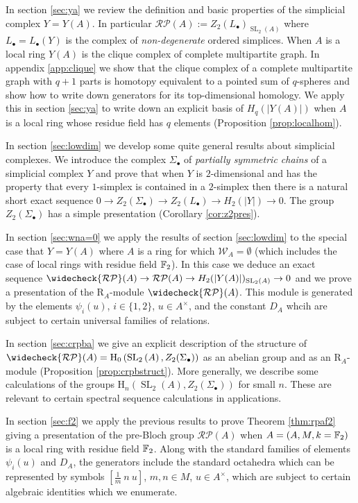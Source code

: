 \documentclass[12pt]{amsart}
\theoremstyle{definition}
\newcommand{\F}[1]{\Bbb{F}_{#1}}
\newcommand{\wn}[1]{\mathcal{W}_{#1}}%
\newcommand{\scyc}[1]{\left[ #1 \right]} %
\newcommand{\spl}[2]{\operatorname{SL}_{#1}\left(#2\right)}
\newcommand{\rpb}[1]{\mathcal{RP}(#1)}%
\newcommand{\crpb}[1]{\widecheck{\mathcal{RP}}(#1)}
\newcommand{\suss}[2]{\psi_{#1}\left( #2\right)}
\newcommand{\cconst}[1]{D_{#1}}
\newcommand{\<}{\langle}
\renewcommand{\>}{\rangle}
\newcommand{\sgr}[1]{\mathrm{R}_{#1}}%
\newcommand{\ho}[3]{\mathrm{H}_{#1}\left( #2,#3 \right)}
\begin{document}
In section \ref{sec:ya} we review the definition and basic properties of the simplicial complex $Y=Y(A)$. In particular $\rpb{A}:=Z_2(L_\bullet)_{\spl{2}{A}}$ where  $L_\bullet=L_\bullet(Y)$ is the complex of \emph{non-degenerate} ordered simplices. When $A$ is a local ring $Y(A)$ is the clique complex of complete multipartite graph.
In appendix \ref{app:clique} we show that the clique complex of a complete multipartite graph with $q+1$ parts  is homotopy equivalent to  a pointed sum of $q$-spheres and show how to write down generators for its top-dimensional homology. We apply this in section \ref{sec:ya} to write down an explicit basis  of $H_q(|Y(A)|)$ when $A$ is a local ring whose residue field has $q$ elements  (Proposition \ref{prop:localhom}).

In section \ref{sec:lowdim} we develop some quite general results about simplicial complexes. We introduce the complex $\Sigma_\bullet$ of \emph{partially symmetric chains} of a simplicial complex $Y$ and prove that when $Y$ is $2$-dimensional and has the property that every $1$-simplex is contained in a $2$-simplex then there is a natural short exact sequence 
$0\to Z_2(\Sigma_\bullet)\to Z_2(L_\bullet)\to H_2(|Y|)\to 0$. The group $Z_2(\Sigma_\bullet)$ has a simple presentation  (Corollary \ref{cor:z2pres}).

In section \ref{sec:wna=0} we apply the results of section \ref{sec:lowdim} to the special case that $Y=Y(A)$ where $A$ is a ring for which $\wn{A}=\emptyset$ (which includes the case of local rings with residue field $\F{2}$).  In this case we deduce an exact sequence $\crpb{A}\to\rpb{A}\to H_2(|Y(A)|)_{\spl{2}{A}}\to 0$ and we prove a presentation of the $\sgr{A}$-module
$\crpb{A}$. This module is generated by the elements $\suss{i}{u}$, $i\in \{ 1,2\}$, $u\in A^\times$,  and the constant $\cconst{A}$ whcih are subject to certain universal families of relations. 

In section \ref{sec:crpba} we give an explicit description of the structure of $\crpb{A}=\ho{0}{\spl{2}{A}}{Z_2(\Sigma_\bullet)}$ as an abelian group and as an $\sgr{A}$-module
 (Proposition \ref{prop:crpbstruct}).  More generally, we describe some  
calculations of the groups
 $\ho{n}{\spl{2}{A}}{Z_2(\Sigma_\bullet)}$ for small $n$. These are relevant to certain spectral sequence calculations in applications.

In section \ref{sec:f2} we apply the previous results to prove Theorem \ref{thm:rpaf2} giving a presentation of the pre-Bloch group $\rpb{A}$ when $A=(A,{M},k=\F{2})$ is a local ring with residue field $\F{2}$. Along with the standard families of elements $\suss{i}{u}$  and $\cconst{A}$, the generators include the standard octahedra which can be represented by symbols $\scyc{\frac{1}{m}\ n\ u}$,
$m,n\in {M}$, $u\in A^\times$, which are subject to certain algebraic identities which we enumerate.
\end{document}
